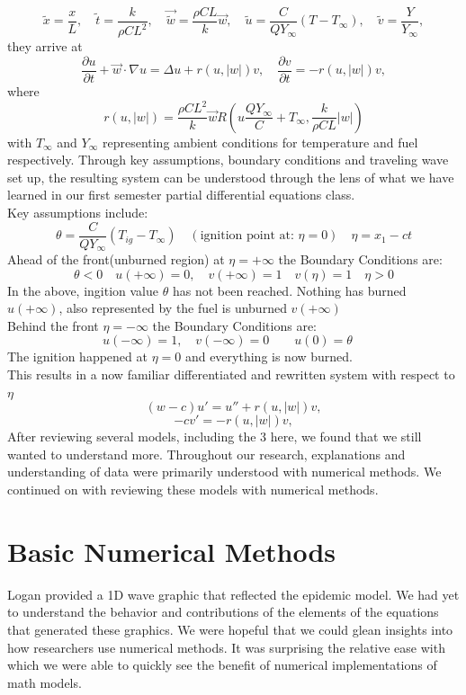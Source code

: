 \documentclass{article}
\begin{document}
    $$\tilde{x}=\frac{x}{L},\quad \tilde{t}=\frac{k}{\rho C L^2},\quad \vec{\tilde{w}}=\frac{\rho C L}{k}\vec{w},\quad \tilde{u}=\frac{C}{QY_\infty}(T-T_\infty),\quad \tilde{v}=\frac{Y}{Y_\infty},$$
    they arrive at
    $$\frac{\partial u}{\partial t}+\vec{w}\cdot \nabla u=\Delta u + r(u,|w|)v,\quad \frac{\partial v}{\partial t}=-r(u,|w|)v,$$
    where
    $$r(u,|w|)=\frac{\rho C L^2}{k}\vec{w}R \left(u\frac{QY_\infty}{C}+T_\infty, \frac{k}{\rho C L}|w|\right)$$
    with $T_\infty$ and $Y_\infty$ representing ambient conditions for temperature and fuel respectively.  Through key assumptions, boundary conditions and traveling wave set up, the resulting system can be understood through the lens of what we have learned in our first semester partial differential equations class.  \\
    Key assumptions include:
    $$\theta=\frac{C}{QY_\infty}(T_{ig}-T_\infty)\quad (\text{ignition point at: }\eta=0) \quad \eta = x_1-ct$$
    Ahead of the front(unburned region) at $\eta=+\infty$ the Boundary Conditions are: 
    $$\theta<0 \quad u(+\infty)=0, \quad v(+\infty)=1\quad v(\eta)=1 \quad \eta>0$$
    In the above, ingition value $\theta$ has not been reached. Nothing has burned $u(+\infty)$, also represented by the fuel is unburned $v(+\infty)$ \\
    Behind the front $\eta=-\infty$ the Boundary Conditions are:
    $$u(-\infty)=1, \quad v(-\infty)=0\qquad u(0)=\theta\quad$$
    The ignition happened at $\eta=0$ and everything is now burned.\\
    This results in a now familiar differentiated and rewritten system with respect to $\eta$
    $$(w-c)u'=u''+r(u,|w|)v,$$
    $$-cv'=-r(u,|w|)v,$$
After reviewing several models, including the 3 here, we found that we still wanted to understand more. Throughout our research, explanations and understanding of data were primarily understood with numerical methods. We continued on with reviewing these models with numerical methods.

\section{Basic Numerical Methods}
Logan provided a 1D wave graphic that reflected the epidemic model. We had yet to understand the behavior and contributions of the elements of the equations that generated these graphics.
We were hopeful that we could glean insights into how researchers use numerical methods. It was surprising the relative ease with which we were able to quickly see the benefit of numerical implementations of math models.
\end{document}
